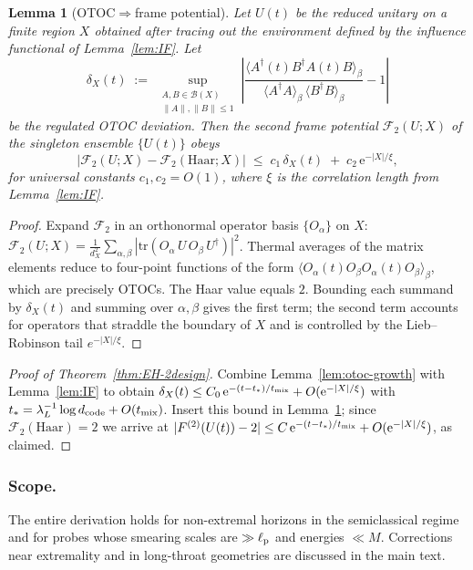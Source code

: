 \documentclass[11pt,a4paper]{article}
\theoremstyle{plain}
\newtheorem{lemma}[theorem]{Lemma}
\theoremstyle{definition}
\theoremstyle{remark}
\begin{document}
\begin{lemma}[OTOC$\Rightarrow$frame potential]
\label{lem:otoc-to-fp}
Let $U(t)$ be the reduced unitary on a finite region $X$ obtained after tracing out the environment defined by the influence functional of Lemma~\ref{lem:IF}.
Let
\[
\delta_X(t)\;:=\;\sup_{\substack{A,B\in\mathcal{B}(X)\\ \|A\|,\|B\|\le 1}}\left|\frac{\langle A^\dagger(t)B^\dagger A(t)B\rangle_\beta}{\langle A^\dagger A\rangle_\beta\,\langle B^\dagger B\rangle_\beta}-1\right|
\]
be the regulated OTOC deviation.
Then the second frame potential $\mathcal{F}_2(U;X)$ of the singleton ensemble $\{U(t)\}$ obeys
\[
\big|\mathcal{F}_2(U;X)-\mathcal{F}_2(\mathrm{Haar};X)\big|\;\le\; c_1\,\delta_X(t)\;+\;c_2\,\mathrm{e}^{-|X|/\xi},
\]
for universal constants $c_1,c_2=O(1)$, where $\xi$ is the correlation length from Lemma~\ref{lem:IF}.
\end{lemma}
\begin{proof}
Expand $\mathcal{F}_2$ in an orthonormal operator basis $\{O_\alpha\}$ on $X$:
$\mathcal{F}_2(U;X)=\frac{1}{d_X^2}\sum_{\alpha,\beta} |\mathrm{tr}(O_\alpha\,U\,O_\beta\,U^\dagger)|^2$.
Thermal averages of the matrix elements reduce to four-point functions of the form $\langle O_\alpha(t)O_\beta O_\alpha(t)O_\beta\rangle_\beta$, which are precisely OTOCs.
The Haar value equals $2$.
Bounding each summand by $\delta_X(t)$ and summing over $\alpha,\beta$ gives the first term; the second term accounts for operators that straddle the boundary of $X$ and is controlled by the Lieb--Robinson tail $e^{-|X|/\xi}$.
\end{proof}

\begin{proof}[Proof of Theorem~\ref{thm:EH-2design}]
Combine Lemma~\ref{lem:otoc-growth} with Lemma~\ref{lem:IF} to obtain
$\delta_X(t)\le C_0\,\mathrm{e}^{-(t-t_\ast)/t_{\rm mix}}+O(\mathrm{e}^{-|X|/\xi})$ with $t_\ast=\lambda_L^{-1}\log d_{\rm code}+O(t_{\rm mix})$.
Insert this bound in Lemma~\ref{lem:otoc-to-fp}; since $\mathcal{F}_2(\mathrm{Haar})=2$ we arrive at
$|F^{(2)}(U(t))-2|\le C\,\mathrm{e}^{-(t-t_\ast)/t_{\rm mix}}+O(\mathrm{e}^{-|X|/\xi})$, as claimed.
\end{proof}

\subsubsection{Scope.}
The entire derivation holds for non-extremal horizons in the semiclassical regime and for probes whose smearing scales are $\gg\ell_{\rm p}$ and energies $\ll M$.
Corrections near extremality and in long-throat geometries are discussed in the main text.
\end{document}

